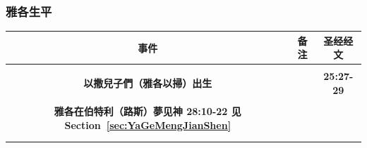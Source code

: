 \subsubsection{雅各生平}
\begin{table}[H]
\begin{threeparttable}
\begin{tabular}{c c c}
\toprule
 \multicolumn{1}{L{\dimexpr0.5\linewidth-1\tabcolsep\relax}}{\bfseries 事件} 
&\multicolumn{1}{L{\dimexpr0.2\linewidth-1\tabcolsep\relax}}{\bfseries  备注}   
&\multicolumn{1}{L{\dimexpr0.1\linewidth-1\tabcolsep\relax}}{\bfseries 圣经经文} \\\hline

\multicolumn{1}{L{\dimexpr0.5\linewidth-1\tabcolsep\relax}}{\bfseries }  
& \multicolumn{1}{L{\dimexpr0.2\linewidth-1\tabcolsep\relax}}{\bfseries }
& \multicolumn{1}{L{\dimexpr0.1\linewidth-1\tabcolsep\relax}}{\bfseries }\\ 

\multicolumn{1}{L{\dimexpr0.5\linewidth-1\tabcolsep\relax}}{\bfseries 以撒兒子們（雅各以掃）出生}  
& \multicolumn{1}{L{\dimexpr0.2\linewidth-1\tabcolsep\relax}}{\bfseries }
& \multicolumn{1}{L{\dimexpr0.1\linewidth-1\tabcolsep\relax}}{\bfseries 25:27-29}\\ 

\multicolumn{1}{L{\dimexpr0.5\linewidth-1\tabcolsep\relax}}{\bfseries }  
& \multicolumn{1}{L{\dimexpr0.2\linewidth-1\tabcolsep\relax}}{\bfseries }
& \multicolumn{1}{L{\dimexpr0.1\linewidth-1\tabcolsep\relax}}{\bfseries }\\ 

\multicolumn{1}{L{\dimexpr0.5\linewidth-1\tabcolsep\relax}}{\bfseries 雅各在伯特利（路斯）夢见神 28:10-22 见Section~\ref{sec:YaGeMengJianShen}}  
& \multicolumn{1}{L{\dimexpr0.2\linewidth-1\tabcolsep\relax}}{\bfseries }
& \multicolumn{1}{L{\dimexpr0.1\linewidth-1\tabcolsep\relax}}{\bfseries }\\ 

\multicolumn{1}{L{\dimexpr0.5\linewidth-1\tabcolsep\relax}}{\bfseries }  
& \multicolumn{1}{L{\dimexpr0.2\linewidth-1\tabcolsep\relax}}{\bfseries }
& \multicolumn{1}{L{\dimexpr0.1\linewidth-1\tabcolsep\relax}}{\bfseries }\\ 

\multicolumn{1}{L{\dimexpr0.5\linewidth-1\tabcolsep\relax}}{\bfseries }  
& \multicolumn{1}{L{\dimexpr0.2\linewidth-1\tabcolsep\relax}}{\bfseries }
& \multicolumn{1}{L{\dimexpr0.1\linewidth-1\tabcolsep\relax}}{\bfseries }\\ 


\end{tabular}
\end{threeparttable}
\end{table}
